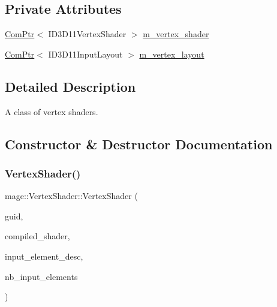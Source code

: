 \subsection*{Private Attributes}
\begin{DoxyCompactItemize}
\item 
\hyperlink{namespacemage_ae74f374780900893caa5555d1031fd79}{Com\+Ptr}$<$ I\+D3\+D11\+Vertex\+Shader $>$ \hyperlink{classmage_1_1_vertex_shader_a0b2b02abae4cb226c115d7f1c5464a54}{m\+\_\+vertex\+\_\+shader}
\item 
\hyperlink{namespacemage_ae74f374780900893caa5555d1031fd79}{Com\+Ptr}$<$ I\+D3\+D11\+Input\+Layout $>$ \hyperlink{classmage_1_1_vertex_shader_a9b9895650b8c7f80af846d75f7d9ddda}{m\+\_\+vertex\+\_\+layout}
\end{DoxyCompactItemize}


\subsection{Detailed Description}
A class of vertex shaders. 

\subsection{Constructor \& Destructor Documentation}
\hypertarget{classmage_1_1_vertex_shader_a95e00fc26b45cd53e8f1a6fec67ce942}{}\label{classmage_1_1_vertex_shader_a95e00fc26b45cd53e8f1a6fec67ce942} 
\subsubsection{\texorpdfstring{Vertex\+Shader()}{VertexShader()}\hspace{0.1cm}{\footnotesize\ttfamily [1/4]}}
{\footnotesize\ttfamily mage\+::\+Vertex\+Shader\+::\+Vertex\+Shader (\begin{DoxyParamCaption}\item[{const wstring \&}]{guid,  }\item[{const \hyperlink{structmage_1_1_compiled_shader}{Compiled\+Shader} $\ast$}]{compiled\+\_\+shader,  }\item[{const D3\+D11\+\_\+\+I\+N\+P\+U\+T\+\_\+\+E\+L\+E\+M\+E\+N\+T\+\_\+\+D\+E\+SC $\ast$}]{input\+\_\+element\+\_\+desc,  }\item[{uint32\+\_\+t}]{nb\+\_\+input\+\_\+elements }\end{DoxyParamCaption})\hspace{0.3cm}{\ttfamily [explicit]}}

